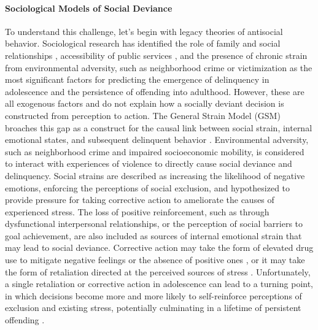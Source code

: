 \documentclass[utf8]{article}
\begin{document}
\paragraph{Sociological Models of Social Deviance} To understand this challenge, let's begin with legacy theories of antisocial behavior. Sociological research has identified the role of family and social relationships \citep{tolan1997assessment,henry2001longitudinal}, accessibility of public services \citep{molnar2008effects}, and the presence of chronic strain from environmental adversity, such as neighborhood crime or victimization \citep{esbensen1991juvenile} as the most significant factors for predicting the emergence of delinquency in adolescence and the persistence of offending into adulthood. However, these are all exogenous factors and do not explain how a socially deviant decision is constructed from perception to action. The General Strain Model (GSM) broaches this gap as a construct for the causal link between social strain, internal emotional states, and subsequent delinquent behavior \citep{agnew2001building,agnew2007pressure}. Environmental adversity, such as neighborhood crime and impaired socioeconomic mobility, is considered to interact with experiences of violence to directly cause social deviance and delinquency. Social strains are described as increasing the likelihood of negative emotions, enforcing the perceptions of social exclusion, and hypothesized to provide pressure for taking corrective action to ameliorate the causes of experienced stress. The loss of positive reinforcement, such as through dysfunctional interpersonal relationships, or the perception of social barriers to goal achievement, are also included as sources of internal emotional strain that may lead to social deviance. Corrective action may take the form of elevated drug use to mitigate negative feelings or the absence of positive ones \citep{slocum2010general}, or it may take the form of retaliation directed at the perceived sources of stress \citep{warner2003strain}. Unfortunately, a single retaliation or corrective action in adolescence can lead to a turning point, in which decisions become more and more likely to self-reinforce perceptions of exclusion and existing stress, potentially culminating in a lifetime of persistent offending \citep{laub1993turning}. 
\end{document}
